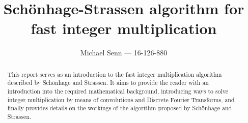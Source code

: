 \documentclass[a4paper]{scrreprt}
\title{Schönhage-Strassen algorithm for fast integer multiplication}
\author{Michael Senn \maillink{michael.senn@students.unibe.ch} --- 16-126-880}
\date{\printdate}
\begin{document}
\maketitle

\begin{abstract}
		This report serves as an introduction to the fast integer
		multiplication algorithm described by Schönhage and Strassen. It aims
		to provide the reader with an introduction into the required
		mathematical background, introducing ways to solve integer
		multiplication by means of convolutions and Discrete Fourier
		Transforms, and finally provides details on the workings of the
		algorithm proposed by Schönhage and Strassen.
\end{abstract}











\printbibliography
\end{document}
